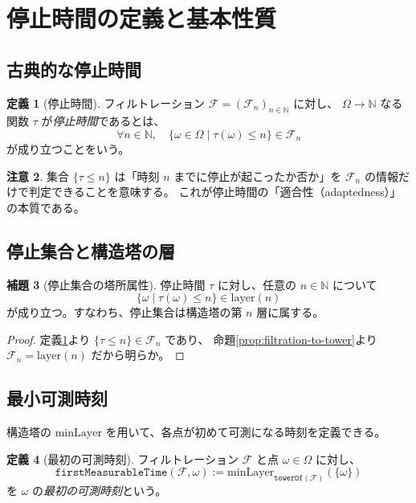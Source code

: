 \documentclass[11pt,a4paper,ja=standard]{ltjsarticle}
\theoremstyle{definition}
\newtheorem{definition}{定義}[section]
\newtheorem{lemma}[definition]{補題}
\newtheorem{remark}[definition]{注意}
\newcommand{\N}{\mathbb{N}}
\newcommand{\F}{\mathcal{F}}
\newcommand{\minLayer}{\mathrm{minLayer}}
\newcommand{\layer}{\mathrm{layer}}
\begin{document}
\section{停止時間の定義と基本性質}

\subsection{古典的な停止時間}

\begin{definition}[停止時間]\label{def:stopping-time}
フィルトレーション $\F = (\F_n)_{n \in \N}$ に対し、
$\Omega \to \N$ なる関数 $\tau$ が\emph{停止時間}であるとは、
\[
\forall n \in \N,\quad \{\omega \in \Omega \mid \tau(\omega) \le n\} \in \F_n
\]
が成り立つことをいう。
\end{definition}

\begin{remark}
集合 $\{\tau \le n\}$ は「時刻 $n$ までに停止が起こったか否か」を $\F_n$ の情報だけで判定できることを意味する。
これが停止時間の「適合性（adaptedness）」の本質である。
\end{remark}

\subsection{停止集合と構造塔の層}

\begin{lemma}[停止集合の塔所属性]\label{lem:stopping-sets-in-tower}
停止時間 $\tau$ に対し、任意の $n \in \N$ について
\[
\{\omega \mid \tau(\omega) \le n\} \in \layer(n)
\]
が成り立つ。すなわち、停止集合は構造塔の第 $n$ 層に属する。
\end{lemma}

\begin{proof}
定義\ref{def:stopping-time}より $\{\tau \le n\} \in \F_n$ であり、
命題\ref{prop:filtration-to-tower}より $\F_n = \layer(n)$ だから明らか。
\end{proof}

\subsection{最小可測時刻}

構造塔の $\minLayer$ を用いて、各点が初めて可測になる時刻を定義できる。

\begin{definition}[最初の可測時刻]\label{def:first-measurable-time}
フィルトレーション $\F$ と点 $\omega \in \Omega$ に対し、
\[
\mathtt{firstMeasurableTime}(\F, \omega) := \minLayer_{\mathtt{towerOf}(\F)}(\{\omega\})
\]
を $\omega$ の\emph{最初の可測時刻}という。
\end{definition}
\end{document}
